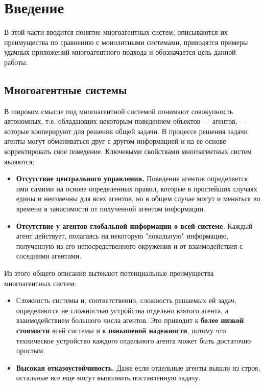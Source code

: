\section*{Введение}					    %

В этой части вводится понятие многоагентных систем, описываются их преимущества по сравнению с монолитными системами, приводятся примеры удачных приложений многоагентного подхода и обозначается цель данной работы.

\subsection*{Многоагентные системы}

В широком смысле под многоагентной системой понимают
совокупность автономных, т.е. обладающих некоторым 
поведением объектов --- агентов, --- которые кооперируют для решения общей задачи. В процессе решения
задачи агенты могут обмениваться друг с другом
информацией и на ее основе корректировать свое поведение. 
Ключевыми свойствами многоагентных систем являются:
\begin{itemize}
\item \textbf{Отсутствие центрального управления.} Поведение
агентов определяется ими самими на основе определенных
правил, которые в простейших случаях едины и неизменны
для всех агентов, но в общем случае могут и меняться во
времени в зависимости от полученной агентом информации.
\item \textbf{Отсутствие у агентов глобальной информации о всей
системе.} Каждый агент действует, полагаясь на некоторую
"локальную" информацию, полученную из его
непосредственного окружения и от взаимодействия с  соседними агентами.
\end{itemize}

Из этого общего описания вытекают потенциальные преимущества многоагентных систем:
\begin{itemize}
\item Сложность системы и,
 соответственно, сложность решаемых ей задач, определяются 
 не сложностью устройства 
отдельно взятого агента, а взаимодействием большого числа агентов. 
Это приводит к \textbf{более низкой стоимости} всей системы и к \textbf{повышеной  надежности}, потому что техническое устройство каждого отдельного агента  
может быть достаточно простым.
\item \textbf{Высокая отказоустойчивость.} Даже если отдельные агенты вышли из строя, остальные все еще могут выполнить поставленную задачу.
\end{itemize}

